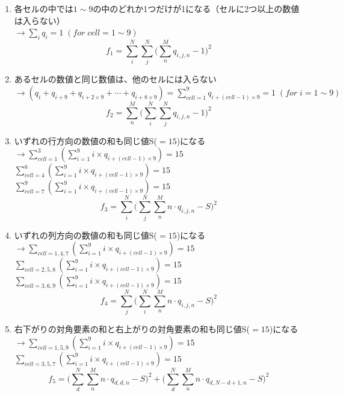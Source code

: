 \documentclass[uplatex,dvipdfmx,a4paper,11pt,oneside,openany]{jsbook}
\begin{document}
\begin{enumerate}
\item 各セルの中では$1\sim 9$の中のどれか1つだけが1になる（セルに2つ以上の数値は入らない）\\
$\rightarrow \sum_i q_i=1 \; (for\; cell=1\sim 9)$
\begin{equation*}
  f_1 = \sum_i^N\sum_j^N\bigg(\sum_n^M q_{i,j,n} - 1\bigg)^2
\end{equation*}
\item あるセルの数値と同じ数値は、他のセルには入らない\\
$\rightarrow (q_i+q_{i+9}+q_{i+2\times9}+\cdots+q_{i+8\times9})=\sum_{cell=1}^9 q_{i+(cell-1)\times9}=1 \;(for\; i=1\sim9)$
\begin{equation*}
  f_2 = \sum_n^M\bigg(\sum_i^N\sum_j^N q_{i,j,n} - 1\bigg)^2
\end{equation*}
\item いずれの行方向の数値の和も同じ値S($=15$)になる\\
$\rightarrow \sum_{cell=1}^3(\sum_{i=1}^9 i\times q_{i+(cell-1)\times9})=15$ \\
\hspace{12pt}$\sum_{cell=4}^6(\sum_{i=1}^9 i\times q_{i+(cell-1)\times9})=15$ \\
\hspace{12pt}$\sum_{cell=7}^9(\sum_{i=1}^9 i\times q_{i+(cell-1)\times9})=15$
\begin{equation*}
  f_3 = \sum_i^N\bigg(\sum_j^N\sum_n^M n \cdot q_{i,j,n} - S\bigg)^2
\end{equation*}
\item いずれの列方向の数値の和も同じ値S($=15$)になる\\
$\rightarrow \sum_{cell=1,4,7}(\sum_{i=1}^9 i\times q_{i+(cell-1)\times9})=15 $ \\
\hspace{12pt}$\sum_{cell=2,5,8}(\sum_{i=1}^9 i\times q_{i+(cell-1)\times9})=15 $\\
\hspace{12pt}$\sum_{cell=3,6,9}(\sum_{i=1}^9 i\times q_{i+(cell-1)\times9})=15$
\begin{equation*}
  f_4 = \sum_j^N\bigg(\sum_i^N\sum_n^M n \cdot q_{i,j,n} - S\bigg)^2
\end{equation*}
\item 右下がりの対角要素の和と右上がりの対角要素の和も同じ値S($=15$)になる\\
$\rightarrow \sum_{cell=1,5,9}(\sum_{i=1}^9 i\times q_{i+(cell-1)\times9})=15 $\\
\hspace{12pt}$\sum_{cell=3,5,7}(\sum_{i=1}^9 i\times q_{i+(cell-1)\times9})=15$
\begin{equation*}
  f_5 = \bigg(\sum_d^N\sum_n^M n\cdot q_{d,d,n} - S\bigg)^2 + \bigg(\sum_d^N\sum_n^M n \cdot q_{d,N-d+1,n} - S\bigg)^2
\end{equation*}
\end{enumerate}
\end{document}
